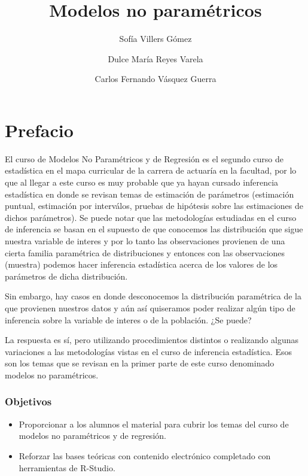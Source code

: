 \documentclass[
  a4paper,
  oneside,
  openany]{book}
\title{Modelos no paramétricos}
\author{Sofía Villers Gómez \and Dulce María Reyes Varela \and Carlos Fernando Vásquez Guerra}
\date{}
\begin{document}
\maketitle

{
\setcounter{tocdepth}{2}
\tableofcontents
}
\hypertarget{prefacio}{%
\chapter*{Prefacio}\label{prefacio}}


El curso de Modelos No Paramétricos y de Regresión es el segundo curso de estadística en el mapa curricular de la carrera de actuaría en la facultad, por lo que al llegar a este curso es muy probable que ya hayan cursado inferencia estadística en donde se revisan temas de estimación de parámetros (estimación puntual, estimación por interválos, pruebas de hipótesis sobre las estimaciones de dichos parámetros). Se puede notar que las metodologías estudiadas en el curso de inferencia se basan en el supuesto de que conocemos las distribución que sigue nuestra variable de interes y por lo tanto las observaciones provienen de una cierta familia paramétrica de distribuciones y entonces con las observaciones (muestra) podemos hacer inferencia estadística acerca de los valores de los parámetros de dicha distribución.

Sin embargo, hay casos en donde desconocemos la distribución paramétrica de la que provienen nuestros datos y aún así quiseramos poder realizar algún tipo de inferencia sobre la variable de interes o de la población. ¿Se puede?

La respuesta es sí, pero utilizando procedimientos distintos o realizando algunas variaciones a las metodologías vistas en el curso de inferencia estadística. Esos son los temas que se revisan en la primer parte de este curso denominado modelos no paramétricos.

\hypertarget{objetivos}{%
\subsection*{Objetivos}\label{objetivos}}


\begin{itemize}
\item
  Proporcionar a los alumnos el material para cubrir los temas del curso de modelos no paramétricos y de regresión.
\item
  Reforzar las bases teóricas con contenido electrónico completado con herramientas de R-Studio.
\end{itemize}
\end{document}
